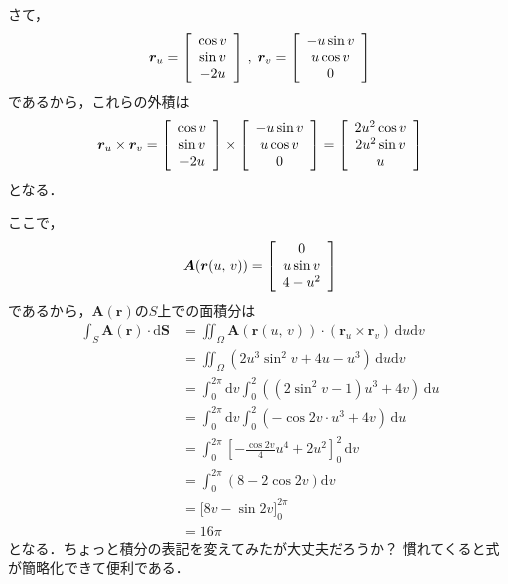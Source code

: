さて，
\begin{align*}
\bm{r}_u = \left[
\renewcommand{\arraystretch}{1}
\begin{array}{c}
 \cos v \\
\sin v \\
-2u
\end{array}
\right]
\, , \; \bm{r}_v = \left[
\renewcommand{\arraystretch}{1}
\begin{array}{c}
- u \sin v \\
u \cos v \\
0
\end{array}
\right]
\end{align*}
であるから，これらの外積は
\begin{align*}
\bm{r}_u \times \bm{r}_v = \left[
\renewcommand{\arraystretch}{1}
\begin{array}{c}
 \cos v \\
\sin v \\
-2u
\end{array}
\right] \times \left[
\renewcommand{\arraystretch}{1}
\begin{array}{c}
- u \sin v \\
u \cos v \\
0
\end{array}
\right] = \left[
\renewcommand{\arraystretch}{1}
\begin{array}{c}
2 u^2 \cos v \\
2u^2 \sin v \\
u
\end{array}
\right]
\end{align*}
となる．

ここで，
\begin{align*}
\bm{A}(\bm{r}(u, \, v)) = \left[
\renewcommand{\arraystretch}{1}
\begin{array}{c}
0 \\
u \sin v \\
4 - u ^2
\end{array}
\right]
\end{align*}
であるから，$\bm{A}(\bm{r})$の$S$上での面積分は
\begin{align*}
\int_S \bm{A}(\bm{r}) \cdot \mathrm{d} \bm{S} 
& = \iint_\Omega \bm{A}(\bm{r}(u, \, v)) \cdot ( \bm{r} _u \times \bm{r}_v ) \, \mathrm{d}u \mathrm{d}v \\
& = \iint_\Omega ( 2u^3 \sin^2 v + 4 u - u^3) \, \mathrm{d} u \mathrm{d} v \\
& = \int_0^{2\pi} \mathrm{d} v \int_0^2 ( (2 \sin^2 v - 1) u^3 + 4v) \, \mathrm{d} u \\
& = \int_0^{2 \pi} \mathrm{d} v \int_0^2 ( - \cos 2v \cdot u^3 + 4v ) \, \mathrm{d} u \\
& = \int_0^{2\pi} \left[ - \frac{ \cos 2v}{4} u^4  + 2 u^2 \right]_0^2 \, \mathrm{d} v \\
& = \int_0^{2\pi} ( 8 - 2 \cos 2v ) \mathrm{d}v \\
& = \biggl[ 8 v - \sin 2 v \biggr]_0^{2\pi} \\
& = 16 \pi 
\end{align*} 
となる．ちょっと積分の表記を変えてみたが大丈夫だろうか？ 慣れてくると式が簡略化できて便利である．

